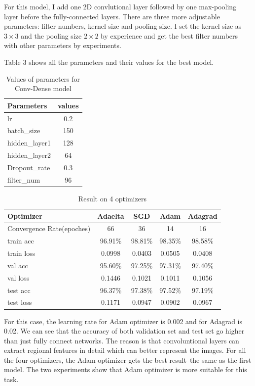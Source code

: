 \documentclass{article}
\begin{document}
For this model, I add one 2D convlutional layer followed by one max-pooling layer before the fully-connected layers. There are three more adjustable parameters: filter numbers, kernel size and pooling size. I set the kernel size as $3\times 3$ and the pooling size $2\times 2$ by experience and get the best filter numbers with other parameters by experiments.

Table 3 shows all the parameters and their values for the best model.

\begin{table}[htbp]
    \caption{Values of parameters for Conv-Dense model}
    \centering
    \begin{tabular}{|l|c|}
    \hline
         Parameters & values \\ \hline
         lr & 0.2 \\
         batch\_size & 150 \\
         hidden\_layer1 & 128  \\
         hidden\_layer2 & 64\\
         Dropout\_rate & 0.3 \\
         filter\_num & 96 \\
         \hline
    \end{tabular}
    \label{table3}
\end{table}

\begin{table}[htbp]
    \caption{Result on 4 optimizers}
    \centering
    \begin{tabular}{|l|c|c|c|c|}
    \hline
         Optimizer  & Adaelta & SGD & Adam & Adagrad\\ \hline
         Convergence Rate(epoches) &  66 & 36 & 14 & 16 \\ \hline
         train acc & 96.91\% & 98.81\% & 98.35\% & 98.58\%\\
         train loss & 0.0998 & 0.0403 & 0.0505 & 0.0408\\ \hline
         val acc &  95.60\% & 97.25\% & 97.31\% & 97.40\% \\
         val loss & 0.1446 &0.1021 &0.1011  & 0.1056\\ \hline
         test acc & 96.37\% & 97.38\% & 97.52\% & 97.19\% \\
         test loss & 0.1171 & 0.0947 & 0.0902  &  0.0967\\ \hline
    \end{tabular}
    \label{table4}
\end{table}

For this case, the learning rate for Adam optimizer is 0.002 and for Adagrad is 0.02. We can see that the accuracy of both validation set and test set go higher than just fully connect networks. The reason is that convoluntional layers can extract regional features in detail which can better represent the images. For all the four optimizers, the Adam optimizer gets the best result--the same as the first model. The two experiments show that Adam optimizer is more suitable for this task.
\end{document}
